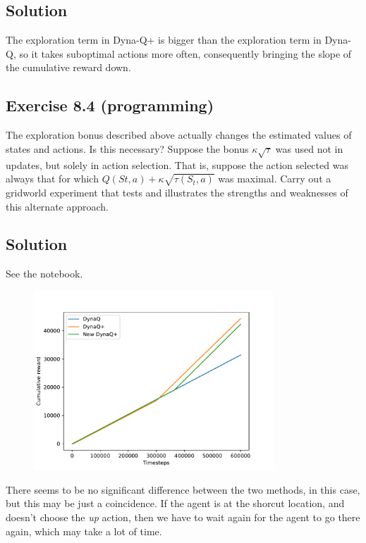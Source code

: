 \subsection*{Solution}
The exploration term in Dyna-Q+ is bigger than the exploration term in Dyna-Q, so it takes
suboptimal actions more often, consequently bringing the slope of the cumulative reward down.

\subsection*{Exercise 8.4 (programming)}
The exploration bonus described above actually changes
the estimated values of states and actions. Is this necessary? Suppose the bonus $\kappa \sqrt{\tau}$
was used not in updates, but solely in action selection. That is, suppose the action
selected was always that for which $Q(S t, a) + \kappa \sqrt{\tau(S_t, a)}$ was maximal. Carry out a
gridworld experiment that tests and illustrates the strengths and weaknesses of this
alternate approach. 

\subsection*{Solution}
See the notebook.

\begin{figure}[H]
    \centering
    \includegraphics[width=0.8\textwidth]{chapters_latex/figures/ex_08_04.pdf}
    \captionsetup{labelformat=empty}
\end{figure}

There seems to be no significant difference between the two methods, in this case, but this may be just a coincidence. If the agent is at the shorcut location, and doesn't choose the \textit{up} action, then we have to wait again for the agent to go there again, which may take a lot of time.

